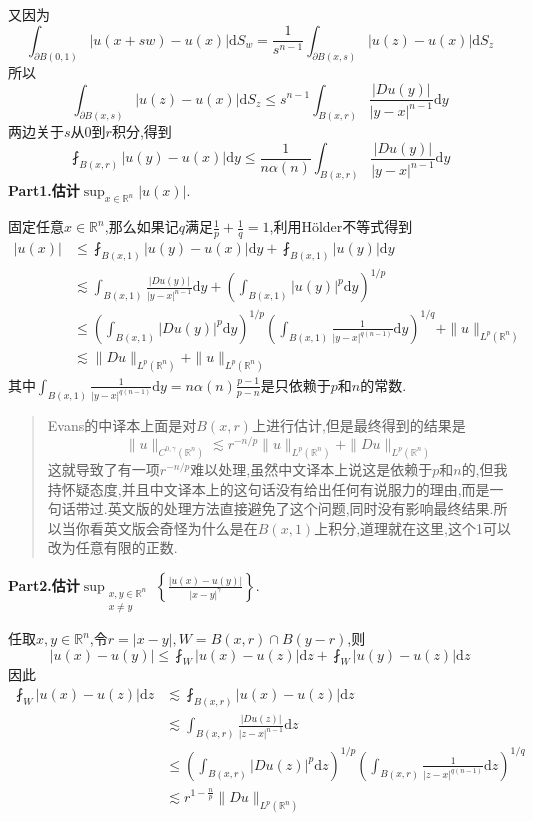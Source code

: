 又因为
$$
\int_{\partial B(0,1)}|u(x+sw)-u(x)|\mathrm{d}S_w=\frac{1}{s^{n-1}}\int_{\partial B(x,s)}|u(z)-u(x)|\mathrm{d}S_z
$$
所以
$$
\int_{\partial B(x,s)}|u(z)-u(x)|\mathrm{d}S_z\leqslant s^{n-1}\int_{B(x,r)}\frac{|Du(y)|}{|y-x|^{n-1}}\mathrm{d}y
$$
两边关于$s$从$0$到$r$积分,得到
$$
\fint_{B(x,r)}|u(y)-u(x)|\mathrm{d}y\leqslant \frac{1}{n\alpha(n)}\int_{B(x,r)}\frac{|Du(y)|}{|y-x|^{n-1}}\mathrm{d}y
$$
\textbf{Part1.估计}$\sup_{x\in\mathbb{R}^n}|u(x)|$.\par
固定任意$x\in\mathbb{R}^n$,那么如果记$q$满足$\frac{1}{p}+\frac{1}{q}=1$,利用Hölder不等式得到
$$
\begin{aligned}
    |u(x)| &\leqslant \fint_{B(x,1)}|u(y)-u(x)|\mathrm{d}y+\fint_{B(x,1)}|u(y)|\mathrm{d}y\\
           &\lesssim \int_{B(x,1)}\frac{|Du(y)|}{|y-x|^{n-1}}\mathrm{d}y+\left(\int_{B(x,1)}|u(y)|^p\mathrm{d}y\right)^{1/p}\\
           &\leqslant \left(\int_{B(x,1)}|Du(y)|^p\mathrm{d}y\right)^{1/p}\left(\int_{B(x,1)}\frac{1}{|y-x|^{q(n-1)}}\mathrm{d}y\right)^{1/q}+\|u\|_{L^p(\mathbb{R}^n)}\\
           &\lesssim \|Du\|_{L^p(\mathbb{R}^n)}+\|u\|_{L^p(\mathbb{R}^n)}
\end{aligned}
$$
其中$\int_{B(x,1)}\frac{1}{|y-x|^{q(n-1)}}\mathrm{d}y=n\alpha(n)\frac{p-1}{p-n}$是只依赖于$p$和$n$的常数.\par
\begin{quote}
    \color{red}
    Evans的中译本上面是对$B(x,r)$上进行估计,但是最终得到的结果是
    $$
    \|u\|_{C^{0,\gamma}(\mathbb{R}^n)}\lesssim r^{-n/p}\|u\|_{L^p(\mathbb{R}^n)}+\|Du\|_{L^p(\mathbb{R}^n)}
    $$
    这就导致了有一项$r^{-n/p}$难以处理,虽然中文译本上说这是依赖于$p$和$n$的,但我持怀疑态度,并且中文译本上的这句话没有给出任何有说服力的理由,而是一句话带过.英文版的处理方法直接避免了这个问题,同时没有影响最终结果.所以当你看英文版会奇怪为什么是在$B(x,1)$上积分,道理就在这里,这个1可以改为任意有限的正数.
\end{quote}
\textbf{Part2.估计}$\sup_{\substack{x,y\in\mathbb{R}^n\\x\neq y}}\left\{\frac{|u(x)-u(y)|}{|x-y|^{\gamma}}\right\}$.\par
任取$x,y\in\mathbb{R}^n$,令$r=|x-y|,W=B(x,r)\cap B(y-r)$,则
$$
|u(x)-u(y)|\leqslant \fint_{W}|u(x)-u(z)|\mathrm{d}z+\fint_{W}|u(y)-u(z)|\mathrm{d}z
$$
因此
$$
\begin{aligned}
    \fint_{W}|u(x)-u(z)|\mathrm{d}z &\lesssim \fint_{B(x,r)}|u(x)-u(z)|\mathrm{d}z\\
                                   &\lesssim \int_{B(x,r)}\frac{|Du(z)|}{|z-x|^{n-1}}\mathrm{d}z\\
                                   &\leqslant \left(\int_{B(x,r)}|Du(z)|^p\mathrm{d}z\right)^{1/p}\left(\int_{B(x,r)}\frac{1}{|z-x|^{q(n-1)}}\mathrm{d}z\right)^{1/q}\\
                                   &\lesssim r^{1-\frac{n}{p}}\|Du\|_{L^p(\mathbb{R}^n)}
\end{aligned}
$$
